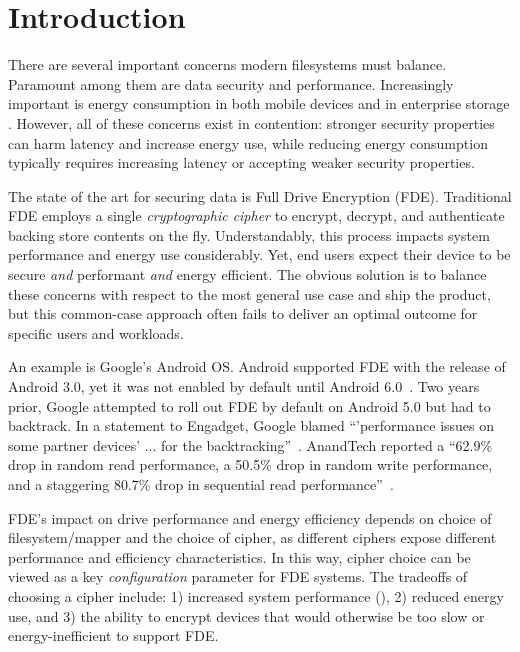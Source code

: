 \section{Introduction}\label{sec:introduction}

There are several important concerns modern filesystems must balance. Paramount
among them are data security and performance. Increasingly important is energy
consumption in both mobile devices and in enterprise storage
\cite{android-M-mobile-motivation, enterprise-motivation}. However, all of these
concerns exist in contention: stronger security properties can harm latency and
increase energy use, while reducing energy consumption typically requires
increasing latency or accepting weaker security properties.

The state of the art for securing data is Full Drive Encryption (FDE).
Traditional FDE employs a single \emph{cryptographic cipher} to encrypt,
decrypt, and authenticate backing store contents on the fly. Understandably,
this process impacts system performance and energy use considerably. Yet, end
users expect their device to be secure \emph{and} performant \emph{and} energy
efficient. The obvious solution is to balance these concerns with respect to the
most general use case and ship the product, but this common-case approach often
fails to deliver an optimal outcome for specific users and workloads.

An example is Google's Android OS. Android supported FDE with the release of
Android 3.0, yet it was not enabled by default until Android
6.0~\cite{android-M-mobile-motivation}. Two years prior, Google attempted to
roll out FDE by default on Android 5.0 but had to backtrack. In a statement to
Engadget, Google blamed ``'performance issues on some partner devices' ... for
the backtracking''~\cite{google-engadget}. AnandTech reported a ``62.9\% drop in
random read performance, a 50.5\% drop in random write performance, and a
staggering 80.7\% drop in sequential read
performance''~\cite{android-M-mobile-motivation-2}.

FDE's impact on drive performance and energy efficiency depends on choice of
filesystem/mapper and the choice of cipher, as different ciphers expose
different performance and efficiency characteristics. In this way, cipher choice
can be viewed as a key \emph{configuration} parameter for FDE systems. The
tradeoffs of choosing a cipher include: 1) increased system performance
(), 2) reduced energy use, and 3) the ability
to encrypt devices that would otherwise be too slow or energy-inefficient to
support FDE.

